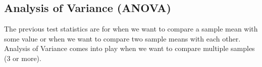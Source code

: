 \subsection{Analysis of Variance (ANOVA)}

The previous test statistics are for when we want to compare a sample mean with some value or when we want to compare two sample means with each other. Analysis of Variance comes into play when we want to compare multiple samples (3 or more). 














